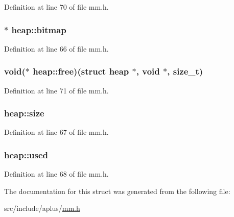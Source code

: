 Definition at line 70 of file mm.\+h.

\hypertarget{structheap_a5243ef46c552fc0968aa2bcdaf6725d1}{
\subsubsection[{bitmap}]{$\ast$ heap\+::bitmap}}\label{structheap_a5243ef46c552fc0968aa2bcdaf6725d1}


Definition at line 66 of file mm.\+h.

\hypertarget{structheap_ae53b14c50bbb9daab4346cd0873bda02}{
\subsubsection[{free}]{\setlength{\rightskip}{0pt plus 5cm}void($\ast$ heap\+::free)(struct {\bf heap} $\ast$, void $\ast$, size\+\_\+t)}}\label{structheap_ae53b14c50bbb9daab4346cd0873bda02}


Definition at line 71 of file mm.\+h.

\hypertarget{structheap_a486fb531d24b9ee5f17b7ffe96689705}{
\subsubsection[{size}]{ heap\+::size}}\label{structheap_a486fb531d24b9ee5f17b7ffe96689705}


Definition at line 67 of file mm.\+h.

\hypertarget{structheap_a37f3f6d6d39562f3cca452eafebcd7ac}{
\subsubsection[{used}]{ heap\+::used}}\label{structheap_a37f3f6d6d39562f3cca452eafebcd7ac}


Definition at line 68 of file mm.\+h.



The documentation for this struct was generated from the following file\+:\begin{DoxyCompactItemize}
\item 
src/include/aplus/\hyperlink{mm_8h}{mm.\+h}\end{DoxyCompactItemize}
